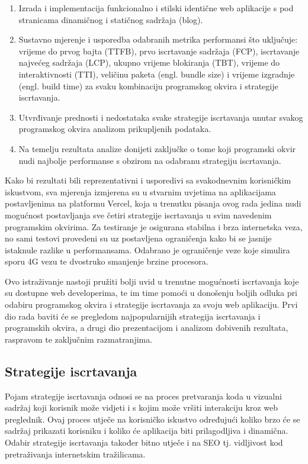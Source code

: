 \begin{enumerate}
    \item Izrada i implementacija funkcionalno i stilski identične web aplikacije s pod stranicama dinamičnog i statičnog sadržaja (blog).
    \item Sustavno mjerenje i usporedba odabranih metrika performansi što uključuje: vrijeme do prvog bajta (TTFB), prvo iscrtavanje sadržaja (FCP), iscrtavanje najvećeg sadržaja (LCP), ukupno vrijeme blokiranja (TBT), vrijeme do interaktivnosti (TTI), veličinu paketa (engl. bundle size) i vrijeme izgradnje (engl. build time) za svaku kombinaciju programskog okvira i strategije iscrtavanja.
    \item Utvrđivanje prednosti i nedostataka svake strategije iscrtavanja unutar svakog programskog okvira analizom prikupljenih podataka.
    \item Na temelju rezultata analize donijeti zaključke o tome koji programski okvir nudi najbolje performanse s obzirom na odabranu strategiju iscrtavanja.
\end{enumerate}

Kako bi rezultati bili reprezentativni i usporedivi sa svakodnevnim korisničkim iskustvom, sva mjerenja izmjerena su u stvarnim uvjetima na aplikacijama postavljenima na platformu Vercel, koja u trenutku pisanja ovog rada jedina nudi mogućnost postavljanja sve četiri strategije iscrtavanja u svim navedenim programskim okvirima. Za testiranje je osigurana stabilna i brza internetska veza, no sami testovi provedeni su uz postavljena ograničenja kako bi se jasnije istaknule razlike u performansama. Odabrano je ograničenje veze koje simulira sporu 4G vezu te dvostruko smanjenje brzine procesora.

\bigskip

Ovo istraživanje nastoji pružiti bolji uvid u trenutne mogućnosti iscrtavanja koje su dostupne web developerima, te im time pomoći u donošenju boljih odluka pri odabiru programskog okvira i strategije iscrtavanja za svoju web aplikaciju. Prvi dio rada baviti će se pregledom najpopularnijih strategija iscrtavanja i programskih okvira, a drugi dio prezentacijom i analizom dobivenih rezultata, raspravom te zaključnim razmatranjima.

\subsection{Strategije iscrtavanja}

Pojam strategije iscrtavanja odnosi se na proces pretvaranja koda u vizualni sadržaj koji korisnik može vidjeti i s kojim može vršiti interakciju kroz web preglednik. \cite{moore2024rendering} Ovaj proces utječe na korisničko iskustvo određujući koliko brzo će se sadržaj prikazati korisniku i koliko će aplikacija biti prilagodljiva i dinamična.
Odabir strategije iscrtavanja također bitno utječe i na SEO tj. vidljivost kod pretraživanja internetskim tražilicama. \cite{bratslavsky2025rendering}

